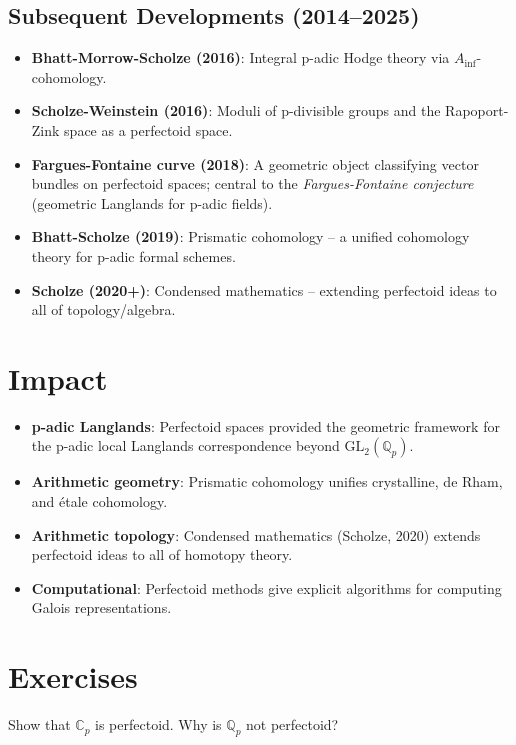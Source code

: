 \subsection{Subsequent Developments (2014--2025)}
\begin{itemize}
\item \textbf{Bhatt-Morrow-Scholze (2016)}: Integral p-adic Hodge theory via $A_{\text{inf}}$-cohomology.
\item \textbf{Scholze-Weinstein (2016)}: Moduli of p-divisible groups and the Rapoport-Zink space as a perfectoid space.
\item \textbf{Fargues-Fontaine curve (2018)}: A geometric object classifying vector bundles on perfectoid spaces; central to the \emph{Fargues-Fontaine conjecture} (geometric Langlands for p-adic fields).
\item \textbf{Bhatt-Scholze (2019)}: Prismatic cohomology -- a unified cohomology theory for p-adic formal schemes.
\item \textbf{Scholze (2020+)}: Condensed mathematics -- extending perfectoid ideas to all of topology/algebra.
\end{itemize}

\section{Impact}
\begin{itemize}
\item \textbf{p-adic Langlands}: Perfectoid spaces provided the geometric framework for the p-adic local Langlands correspondence beyond $\text{GL}_2(\mathbb{Q}_p)$.
\item \textbf{Arithmetic geometry}: Prismatic cohomology unifies crystalline, de Rham, and \'etale cohomology.
\item \textbf{Arithmetic topology}: Condensed mathematics (Scholze, 2020) extends perfectoid ideas to all of homotopy theory.
\item \textbf{Computational}: Perfectoid methods give explicit algorithms for computing Galois representations.
\end{itemize}

\section{Exercises}

\begin{exercise}[Basic]
Show that $\mathbb{C}_p$ is perfectoid. Why is $\mathbb{Q}_p$ not perfectoid?
\end{exercise}

